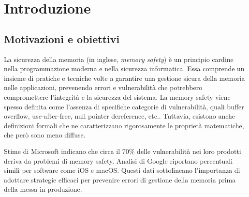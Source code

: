 \chapter{Introduzione}
\label{cha:introduction}

\section*{Motivazioni e obiettivi}
\label{sec:motivation} La sicurezza della memoria (in inglese, \textit{memory
safety}) è un principio cardine nella programmazione moderna e nella sicurezza
informatica. Essa comprende un insieme di pratiche e tecniche volte a garantire una
gestione sicura della memoria nelle applicazioni, prevenendo errori e
vulnerabilità che potrebbero compromettere l'integrità e la sicurezza del
sistema. La memory safety viene spesso definita come l'assenza di specifiche categorie
di vulnerabilità, quali buffer overflow, use-after-free, null pointer
dereference, etc.. Tuttavia, esistono anche definizioni formali che ne
caratterizzano rigorosamente le proprietà matematiche, che però sono meno diffuse.

Stime di Microsoft\cite{microsoft_proactive_approach} indicano che circa il 70\%
delle vulnerabilità nei loro prodotti deriva da problemi di memory safety.
Analisi di Google\cite{google_memory_safety} riportano percentuali simili per software
come iOS e macOS. Questi dati sottolineano l'importanza di adottare strategie
efficaci per prevenire errori di gestione della memoria prima della messa in
produzione.

